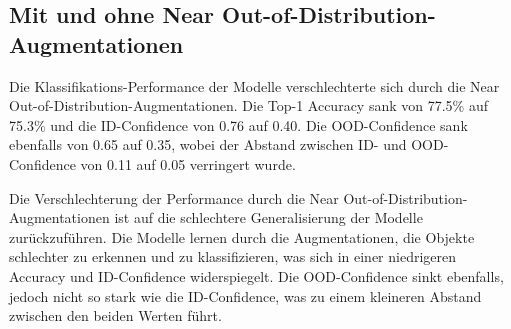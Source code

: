\subsection{Mit und ohne Near Out-of-Distribution-Augmentationen} \label{subsec:results-comparison-ood}

Die Klassifikations-Performance der Modelle verschlechterte sich durch die Near Out-of-Distribution-Augmentationen. Die Top-1 Accuracy sank von 77.5\% auf 75.3\% und die ID-Confidence von 0.76 auf 0.40. Die OOD-Confidence sank ebenfalls von 0.65 auf 0.35, wobei der Abstand zwischen ID- und OOD-Confidence von 0.11 auf 0.05 verringert wurde.

Die Verschlechterung der Performance durch die Near Out-of-Distribution-Augmentationen ist auf die schlechtere Generalisierung der Modelle zurückzuführen. Die Modelle lernen durch die Augmentationen, die Objekte schlechter zu erkennen und zu klassifizieren, was sich in einer niedrigeren Accuracy und ID-Confidence widerspiegelt. Die OOD-Confidence sinkt ebenfalls, jedoch nicht so stark wie die ID-Confidence, was zu einem kleineren Abstand zwischen den beiden Werten führt.